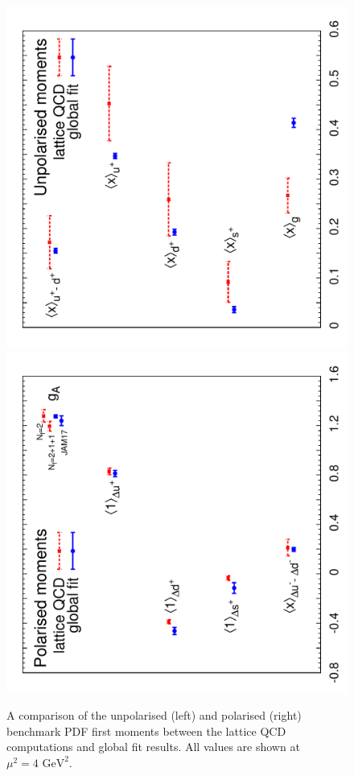 \begin{figure}[!t]
\centering
\includegraphics[scale=0.44,angle=270]{plots/unpmoms}
\includegraphics[scale=0.44,angle=270]{plots/polmoms}\\
\caption{\small A comparison of the unpolarised (left) and polarised (right) 
benchmark PDF first moments between the lattice QCD computations and global fit results.
%
All values are shown at $\mu^2=4\mbox{ GeV}^2$.}
\label{fig:Bmoms}
\end{figure} 

